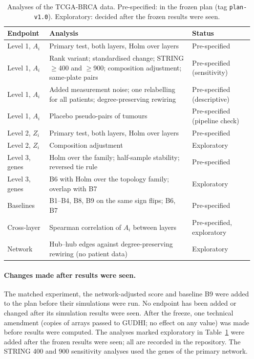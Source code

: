 \begin{table}[H]
\centering\footnotesize
\caption{Analyses of the TCGA-BRCA data. Pre-specified: in the frozen plan (tag \texttt{plan-v1.0}). Exploratory: decided after the frozen results were seen.}
\label{tab:prespec}
\begin{tabular}{p{}p{}p{}}
\toprule
Endpoint & Analysis & Status \\
\midrule
Level 1, $A_i$ & Primary test, both layers, Holm over layers & Pre-specified \\
Level 1, $A_i$ & Rank variant; standardised change; STRING $\ge$400 and $\ge$900; composition adjustment; same-plate pairs & Pre-specified (sensitivity) \\
Level 1, $A_i$ & Added measurement noise; one relabelling for all patients; degree-preserving rewiring & Pre-specified (descriptive) \\
Level 1, $A_i$ & Placebo pseudo-pairs of tumours & Pre-specified (pipeline check) \\
Level 2, $Z_i$ & Primary test, both layers, Holm over layers & Pre-specified \\
Level 2, $Z_i$ & Composition adjustment & Exploratory \\
Level 3, genes & Holm over the family; half-sample stability; reversed tie rule & Pre-specified \\
Level 3, genes & B6 with Holm over the topology family; overlap with B7 & Exploratory \\
Baselines & B1--B4, B8, B9 on the same sign flips; B6, B7 & Pre-specified \\
Cross-layer & Spearman correlation of $A_i$ between layers & Pre-specified, exploratory \\
Network & Hub--hub edges against degree-preserving rewiring (no patient data) & Exploratory \\
\bottomrule
\end{tabular}
\end{table}

\paragraph{Changes made after results were seen.} The matched experiment, the network-adjusted score and baseline B9 were added to the plan before their simulations were run. No endpoint has been added or changed after its simulation results were seen. After the freeze, one technical amendment (copies of arrays passed to GUDHI; no effect on any value) was made before results were computed. The analyses marked exploratory in Table~\ref{tab:prespec} were added after the frozen results were seen; all are recorded in the repository. The STRING 400 and 900 sensitivity analyses used the genes of the primary network.
